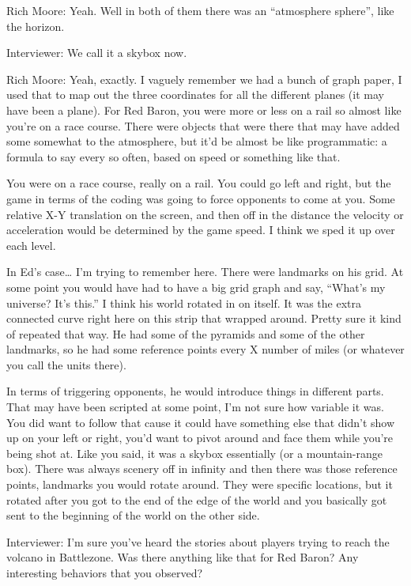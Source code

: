 \textcolor{interviewee}{Rich Moore:} Yeah. Well in both of them there was an “atmosphere sphere”, like the horizon.

\textcolor{interviewer}{Interviewer:} We call it a skybox now.

\textcolor{interviewee}{Rich Moore:} Yeah, exactly. I vaguely remember we had a bunch of graph paper, I used that to map out the three coordinates for all the different planes (it may have been a plane). For Red Baron, you were more or less on a rail so almost like you're on a race course. There were objects that were there that may have added some somewhat to the atmosphere, but it'd be almost be like programmatic: a formula to say every so often, based on speed or something like that. 

You were on a race course, really on a rail. You could go left and right, but the game in terms of the coding was going to force opponents to come at you. Some relative X-Y translation on the screen, and then off in the distance the velocity or acceleration would be determined by the game speed. I think we sped it up over each level.

In Ed's case… I'm trying to remember here. There were landmarks on his grid. At some point you would have had to have a big grid graph and say, “What's my universe? It's this.” I think his world rotated in on itself. It was the extra connected curve right here on this strip that wrapped around. Pretty sure it kind of repeated that way. He had some of the pyramids and some of the other landmarks, so he had some reference points every X number of miles (or whatever you call the units there).

In terms of triggering opponents, he would introduce things in different parts. That may have been scripted at some point, I'm not sure how variable it was. You did want to follow that cause it could have something else that didn't show up on your left or right, you’d want to pivot around and face them while you’re being shot at. Like you said, it was a skybox essentially (or a mountain-range box). There was always scenery off in infinity and then there was those reference points, landmarks you would rotate around. They were specific locations, but it rotated after you got to the end of the edge of the world and you basically got sent to the beginning of the world on the other side.

\textcolor{interviewer}{Interviewer:} I'm sure you've heard the stories about players trying to reach the volcano in Battlezone. Was there anything like that for Red Baron? Any interesting behaviors that you observed?


